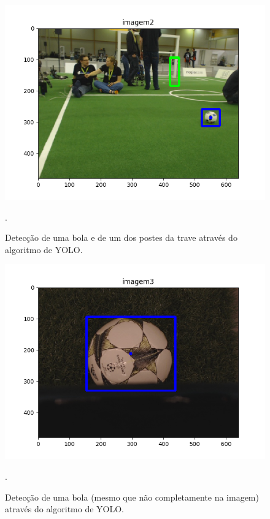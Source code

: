 \documentclass[conference]{IEEEtran}
\begin{document}
\begin{figure}[htbp]
\centering
\centerline{\includegraphics[scale=0.5]{imagens/imagem2_detection.png}}
\caption{Detecção de uma bola e de um dos postes da trave através do algoritmo de YOLO.}.
\label{imagem2_detection}
\end{figure}

\begin{figure}[htbp]
\centering
\centerline{\includegraphics[scale=0.5]{imagens/imagem3_detection.png}}
\caption{Detecção de uma bola (mesmo que não completamente na imagem) através do algoritmo de YOLO.}.
\label{imagem3_detection}
\end{figure}

\end{document}
